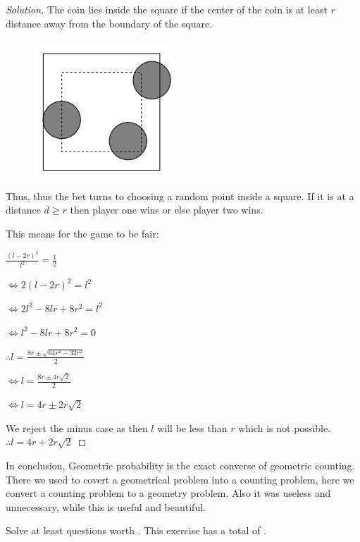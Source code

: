 \begin{proof}
    [Solution]
    The coin lies inside the square if the center of the coin is at least $r$ distance away 
    from the boundary of the square.\par
    \begin{figure}[h]
        \centering
        \includegraphics[width=0.5\linewidth]{Photos/Cointoss onto square.png}        
    \end{figure}
    Thus, thus the bet turns to choosing a random point inside a square. If it is at a 
    distance $d\geq r$ then player one wins or else player two wins.\par
    This means for the game to be fair:\par
    $\frac{(l-2r)^2}{l^2}=\frac{1}{2}$\par
    $\iff 2(l-2r)^2=l^2$\par
    $\iff 2l^2-8lr+8r^2=l^2$\par
    $ \iff l^2-8lr+8r^2=0$\par
    $\therefore l=\frac{8r\pm\sqrt{64r^2-32r^2}}{2}$\par
    $\iff l=\frac{8r\pm4r\sqrt{2}}{2}$\par
    $\iff l=4r\pm2r\sqrt{2}$\par
    We reject the minus case as then $l$ will be less than $r$ which is not possible.
    $\therefore l=4r+2r\sqrt{2}$
\end{proof}
In conclusion, Geometric probability is the exact converse of geometric counting.
There we used to covert a geometrical problem into a counting problem, 
here we convert a counting problem to a geometry problem. Also it was useless and unnecessary, 
while this is useful and beautiful.\par
Solve at least questions worth . This exercise has a total of .

